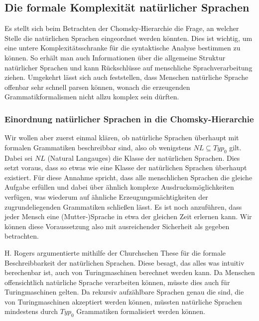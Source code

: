 \documentclass[12pt,a4paper]{article}
\theoremstyle{definition}
\begin{document}
	\subsection{Die formale Komplexität natürlicher Sprachen}
		Es stellt sich beim Betrachten der Chomsky-Hierarchie die Frage, an welcher Stelle die natürlichen Sprachen eingeordnet werden könnten. Dies ist wichtig, um eine untere Komplexitätsschranke für die syntaktische Analyse bestimmen zu können. So erhält man auch Informationen über die allgemeine Struktur natürlicher Sprachen und kann Rückschlüsse auf menschliche Sprachverarbeitung ziehen. Umgekehrt lässt sich auch feststellen, dass Menschen natürliche Sprache offenbar sehr schnell parsen können, wonach die erzeugenden Grammatikformalismen nicht allzu komplex sein dürften.
	
		\subsubsection{Einordnung natürlicher Sprachen in die Chomsky-Hierarchie}
			Wir wollen aber zuerst einmal klären, ob natürliche Sprachen überhaupt mit formalen Grammatiken beschreibbar sind, also ob wenigstens $\mathit{NL} \subseteq Typ_0$ gilt. Dabei sei $\mathit{NL}$ (Natural Langauges) die Klasse der natürlichen Sprachen. Dies setzt voraus, dass so etwas wie eine Klasse der natürlichen Sprachen überhaupt existiert. Für diese Annahme spricht, dass alle menschlichen Sprachen die gleiche Aufgabe erfüllen und dabei über ähnlich komplexe Ausdrucksmöglichkeiten verfügen, was wiederum auf ähnliche Erzeugungsmächtigkeiten der zugrundeliegenden Grammatiken schließen lässt. Es ist noch anzuführen, dass jeder Mensch eine (Mutter-)Sprache in etwa der gleichen Zeit erlernen kann. Wir können diese Voraussetzung also mit ausreichender Sicherheit als gegeben betrachten.
			
			H. Rogers argumentierte mithilfe der Churchschen These für die formale Beschreibbarkeit der natürlichen Sprachen. Diese besagt, das alles was intuitiv berechenbar ist, auch von Turingmaschinen berechnet werden kann. Da Menschen offensichtlich natürliche Sprache verarbeiten können, müsste dies auch für Turingmaschinen gelten. Da rekursiv aufzählbare Sprachen genau die sind, die von Turingmaschinen akzeptiert werden können, müssten natürliche Sprachen mindestens durch $Typ_0$ Grammatiken formalisiert werden können.
			
\end{document}
